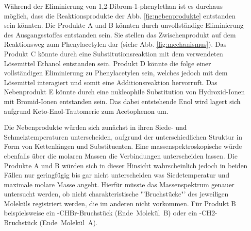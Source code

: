 Während der Eliminierung von 1,2-Dibrom-1-phenylethan ist es durchaus möglich, dass die Reaktionsprodukte der Abb. \ref{fig:nebenprodukte} entstanden sein könnten. 
Die Produkte A und B könnten durch unvollständige Eliminierung des Ausgangsstoffes entstanden sein. Sie stellen das Zwischenprodukt auf dem Reaktionsweg zum Phenylacetylen dar (siehe Abb. \ref{fig:mechanismus}). Das Produkt C könnte durch eine Substitutionsreaktion mit dem verwendeten Lösemittel Ethanol entstanden sein. Produkt D könnte die folge einer vollständigen Eliminierung zu Phenylacetylen sein, welches jedoch mit dem Lösemittel interagiert und somit eine Additionsreaktion hervorruft. Das Nebenprodukt E könnte durch eine nukleophile Substitution von Hydroxid-Ionen mit Bromid-Ionen entstanden sein. Das dabei entstehende Enol wird lagert sich aufgrund Keto-Enol-Tautomerie zum Acetophenon um.


\newpage

Die Nebenprodukte würden sich zunächst in ihren Siede- und Schmelztemperaturen unterscheiden, aufgrund der unterschiedlichen Struktur in Form von Kettenlängen und Substituenten. Eine massenspektroskopische würde ebenfalls über die molaren Massen die Verbindungen unterscheiden lassen. Die Produkte A und B würden sich in dieser Hinsicht wahrscheinlich jedoch in beiden Fällen nur geringfügig bis gar nicht unterscheiden was Siedetemperatur und maximale molare Masse angeht. Hierfür müsste das Massenspektrum genauer untersucht werden, ob nicht charakteristische "'Bruchstücke"' des jeweiligen Moleküls registriert werden, die im anderen nicht vorkommen. Für Produkt B beispielsweise ein -CHBr-Bruchstück \mbox{(Ende Molekül B)} oder ein -CH2-Bruchstück \mbox{(Ende Molekül A)}.

\vfill



